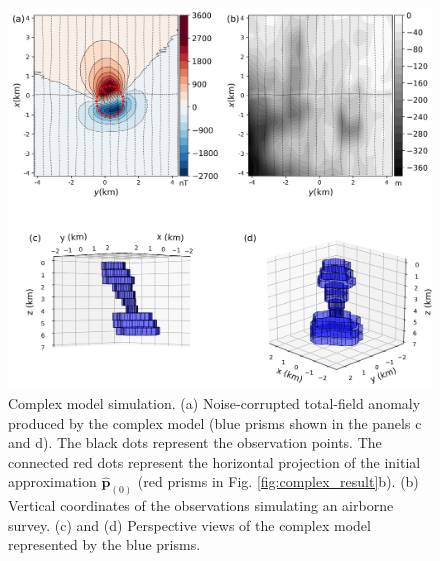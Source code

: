 \begin{figure}
    \centering
    \includegraphics[width=\linewidth]{figures/complex_model_data.png}
    \caption{Complex model simulation. (a) Noise-corrupted total-field anomaly produced by the complex model (blue prisms shown in the panels c and d). The black dots represent the observation points. The connected red dots represent the horizontal projection 
   	of the initial approximation $\hat{\mathbf{p}}_{(0)}$ 
   	(red prisms in Fig. \ref{fig:complex_result}b). (b) Vertical coordinates of the observations simulating an airborne survey. (c) and (d) Perspective views of the complex model represented by the blue prisms.
}
    \label{fig:complex_model}
\end{figure}


